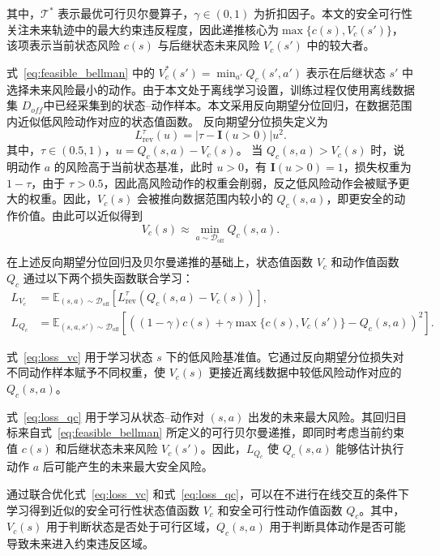其中，$\mathcal{T}^*$ 表示最优可行贝尔曼算子，$\gamma\in(0,1)$ 为折扣因子。本文的安全可行性关注未来轨迹中的最大约束违反程度，因此递推核心为$\max\{c(s),V_c(s')\}$，
该项表示当前状态风险 $c(s)$ 与后继状态未来风险 $V_c(s')$ 中的较大者。

式~\eqref{eq:feasible_bellman} 中的 $V_c^*(s')=\min_{a'}Q_c(s',a')$
表示在后继状态 $s'$ 中选择未来风险最小的动作。由于本文处于离线学习设置，训练过程仅使用离线数据集 $D_{off}$中已经采集到的状态–动作样本。本文采用反向期望分位回归，在数据范围内近似低风险动作对应的状态值函数。
反向期望分位损失定义为
\begin{equation}
    L_{\mathrm{rev}}^\tau(u)
    =
    \left|\tau-\mathbf{I}(u>0)\right|u^2.
    \label{eq:rev_expectile}
\end{equation}
其中，$\tau\in(0.5,1)$，$u=Q_c(s,a)-V_c(s)$。
当 $Q_c(s,a)>V_c(s)$ 时，说明动作 $a$ 的风险高于当前状态基准，此时 $u>0$，有 $\mathbf{I}(u>0)=1$，损失权重为 $1-\tau$，由于 $\tau>0.5$，因此高风险动作的权重会削弱，反之低风险动作会被赋予更大的权重。因此，$V_c(s)$ 会被推向数据范围内较小的 $Q_c(s,a)$，即更安全的动作价值。由此可以近似得到
\begin{equation}
    V_c(s)\approx \min_{a\sim\mathcal{D}_{\mathrm{off}}}Q_c(s,a).
\end{equation}

在上述反向期望分位回归及贝尔曼递推的基础上，状态值函数 $V_c$ 和动作值函数 $Q_c$ 通过以下两个损失函数联合学习：
\begin{align}
    L_{V_c}
    &=
    \mathbb{E}_{(s,a)\sim\mathcal{D}_{\mathrm{off}}}
    \left[
    L_{\mathrm{rev}}^\tau
    \left(
    Q_c(s,a)-V_c(s)
    \right)
    \right],
    \label{eq:loss_vc}
    \\
    L_{Q_c}
    &=
    \mathbb{E}_{(s,a,s')\sim\mathcal{D}_{\mathrm{off}}}
    \left[
    \left(
    (1-\gamma)c(s)
    +
    \gamma\max\{c(s),V_c(s')\}
    -
    Q_c(s,a)
    \right)^2
    \right].
    \label{eq:loss_qc}
\end{align}

式~\eqref{eq:loss_vc} 用于学习状态 $s$ 下的低风险基准值。它通过反向期望分位损失对不同动作样本赋予不同权重，使 $V_c(s)$ 更接近离线数据中较低风险动作对应的 $Q_c(s,a)$。

式~\eqref{eq:loss_qc} 用于学习从状态--动作对 $(s,a)$ 出发的未来最大风险。其回归目标来自式~\eqref{eq:feasible_bellman} 所定义的可行贝尔曼递推，即同时考虑当前约束值 $c(s)$ 和后继状态未来风险 $V_c(s')$。因此，$L_{Q_c}$ 使 $Q_c(s,a)$ 能够估计执行动作 $a$ 后可能产生的未来最大安全风险。

通过联合优化式~\eqref{eq:loss_vc} 和式~\eqref{eq:loss_qc}，可以在不进行在线交互的条件下学习得到近似的安全可行性状态值函数 $V_c$ 和安全可行性动作值函数 $Q_c$。其中，$V_c(s)$ 用于判断状态是否处于可行区域，$Q_c(s,a)$ 用于判断具体动作是否可能导致未来进入约束违反区域。

